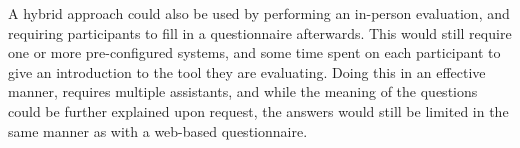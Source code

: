A hybrid approach could also be used by performing an in-person evaluation, and requiring participants to fill in a questionnaire afterwards.
This would still require one or more pre-configured systems, and some time spent on each participant to give an introduction to the tool they are evaluating.
Doing this in an effective manner, requires multiple assistants, and while the meaning of the questions could be further explained upon request, the answers would still be limited in the same manner as with a web-based questionnaire.


